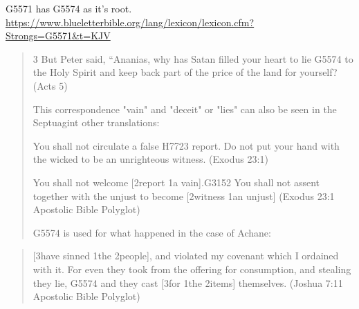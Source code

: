 \documentclass[11pt]{article}
\begin{document}
\begin{thebibliography}{37}
G5571 has G5574 as it's root. \newline
\url{https://www.blueletterbible.org/lang/lexicon/lexicon.cfm?Strongs=G5571&t=KJV}

\begin{quote}
3 But Peter said, “Ananias, why has Satan filled your heart to lie G5574 to the Holy Spirit and keep back part of the price of the land for yourself?
(Acts 5)

This correspondence "vain" and "deceit" or "lies" can also be seen in the Septuagint other translations:

You shall not circulate a false H7723 report. Do not put your hand with the wicked to be an unrighteous witness.\newline
(Exodus 23:1)

You shall not welcome [2report 1a vain].G3152 You shall not assent together with the unjust to become [2witness 1an unjust]\newline
(Exodus 23:1 Apostolic Bible Polyglot)\newline

G5574 is used for what happened in the case of Achane:\newline
\end{quote}
\begin{quote}
[3have sinned 1the 2people], and violated my covenant which I ordained with it. For even they took from the offering for consumption, and stealing they lie, G5574 and they cast [3for 1the 2items] themselves.\newline
(Joshua 7:11 Apostolic Bible Polyglot)\newline


\end{quote}
\end{thebibliography}
\end{document}

